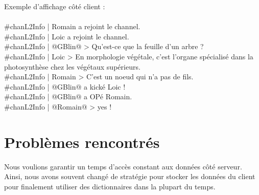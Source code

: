 \documentclass[12pt]{article}
\begin{document}
{Exemple d'affichage côté client :
\\
\\
\#chanL2Info | Romain a rejoint le channel.\\
\#chanL2Info | Loic a rejoint le channel.\\
\#chanL2Info | @GBlin@ > Qu'est-ce que la feuille d'un arbre ?\\
\#chanL2Info | Loic > En morphologie végétale, c'est l'organe spécialisé dans la photosynthèse chez les végétaux supérieurs.\\
\#chanL2Info | Romain > C'est un noeud qui n'a pas de fils.\\
\#chanL2Info | @GBlin@ a kické Loic !\\
\#chanL2Info | @GBlin@ a OPé Romain.\\
\#chanL2Info | @Romain@ > yes !\\


\section{Problèmes rencontrés}

Nous voulions garantir un temps d'accès constant aux données côté serveur. Ainsi, nous avons souvent changé de stratégie
pour stocker les données du client pour finalement utiliser des dictionnaires dans la plupart du temps.
\\

}
\end{document}

